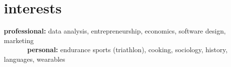 \documentclass[a4paper]{friggeri-cv} %
\begin{document}

\section{interests}

\textbf{professional:} data analysis, entrepreneurship, economics, software design, marketing \\
\textbf{\ \ \ \ \ \ personal:} endurance sports (triathlon), cooking, sociology, history, languages, wearables









\end{document}
